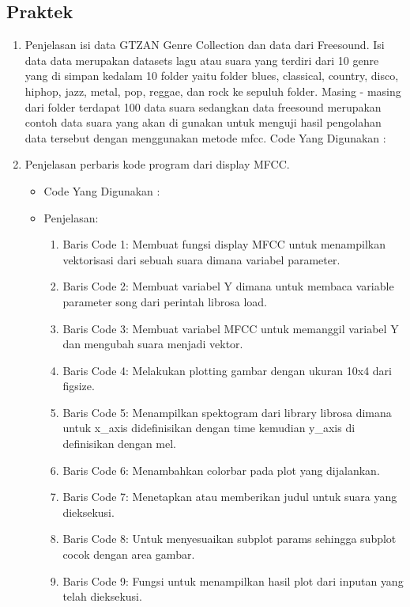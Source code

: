 \subsection{Praktek}
\begin{enumerate}

\item Penjelasan isi data GTZAN Genre Collection dan data dari Freesound.
Isi data data merupakan datasets lagu atau suara yang terdiri dari 10 genre yang di simpan kedalam 10 folder yaitu folder blues, classical, country, disco, hiphop, jazz, metal, pop, reggae, dan rock ke sepuluh folder. Masing - masing dari folder terdapat 100 data suara sedangkan data freesound merupakan contoh data suara yang akan di gunakan untuk menguji hasil pengolahan data tersebut dengan menggunakan metode mfcc.
Code Yang Digunakan :


\item Penjelasan perbaris kode program dari display MFCC.
\begin{itemize}
\item Code Yang Digunakan :


\item Penjelasan:

\begin{enumerate}
\item Baris Code 1: Membuat fungsi display MFCC untuk menampilkan vektorisasi dari sebuah suara dimana variabel parameter.
\item Baris Code 2: Membuat variabel Y dimana untuk membaca variable parameter song dari perintah librosa load.
\item Baris Code 3: Membuat variabel MFCC untuk memanggil variabel Y dan mengubah suara menjadi vektor.
\item Baris Code 4: Melakukan plotting gambar dengan ukuran 10x4 dari figsize.
\item Baris Code 5: Menampilkan spektogram dari library librosa dimana untuk x\_axis didefinisikan dengan time kemudian y\_axis di definisikan dengan mel.
\item Baris Code 6: Menambahkan colorbar pada plot yang dijalankan.
\item Baris Code 7: Menetapkan atau memberikan judul untuk suara yang dieksekusi.
\item Baris Code 8: Untuk menyesuaikan subplot params sehingga subplot cocok dengan area gambar.
\item Baris Code 9: Fungsi untuk menampilkan hasil plot dari inputan yang telah dieksekusi.
\end{enumerate}


\end{itemize}
\end{enumerate}
